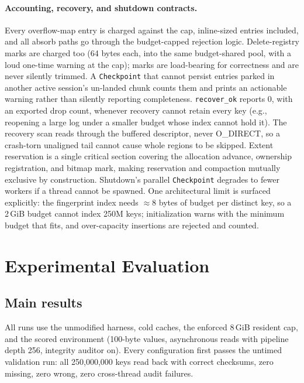 \documentclass{article}
\newcommand{\NKeys}{250{,}000{,}000}
\newcommand{\NKeysShort}{250M}
\newcommand{\MemBudget}{8\,GiB}
\begin{document}
\paragraph{Accounting, recovery, and shutdown contracts.}
Every overflow-map entry is charged against the cap, inline-sized entries included, and all absorb paths go through the budget-capped rejection logic. Delete-registry marks are charged too (64 bytes each, into the same budget-shared pool, with a loud one-time warning at the cap); marks are load-bearing for correctness and are never silently trimmed. A \texttt{Checkpoint} that cannot persist entries parked in another active session's un-landed chunk counts them and prints an actionable warning rather than silently reporting completeness. \texttt{recover\_ok} reports 0, with an exported drop count, whenever recovery cannot retain every key (e.g., reopening a large log under a smaller budget whose index cannot hold it). The recovery scan reads through the buffered descriptor, never O\_DIRECT, so a crash-torn unaligned tail cannot cause whole regions to be skipped. Extent reservation is a single critical section covering the allocation advance, ownership registration, and bitmap mark, making reservation and compaction mutually exclusive by construction. Shutdown's parallel \texttt{Checkpoint} degrades to fewer workers if a thread cannot be spawned. One architectural limit is surfaced explicitly: the fingerprint index needs $\approx$8 bytes of budget per distinct key, so a 2\,GiB budget cannot index \NKeysShort{} keys; initialization warns with the minimum budget that fits, and over-capacity insertions are rejected and counted.

\section{Experimental Evaluation}
\label{sec:eval}

\subsection{Main results}
\label{sec:mainresults}

All runs use the unmodified harness, cold caches, the enforced \MemBudget{} resident cap, and the scored environment (100-byte values, asynchronous reads with pipeline depth 256, integrity auditor on). Every configuration first passes the untimed validation run: all \NKeys{} keys read back with correct checksums, zero missing, zero wrong, zero cross-thread audit failures.
\end{document}
